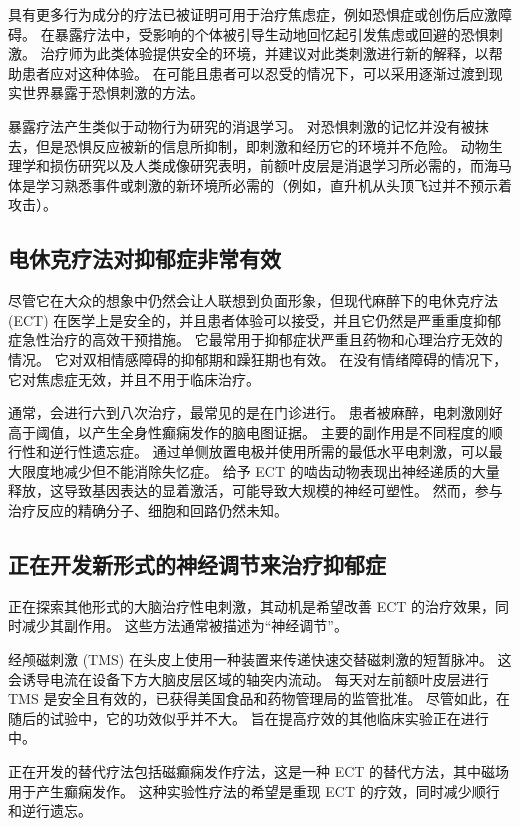 具有更多行为成分的疗法已被证明可用于治疗焦虑症，例如恐惧症或创伤后应激障碍。
在暴露疗法中，受影响的个体被引导生动地回忆起引发焦虑或回避的恐惧刺激。
治疗师为此类体验提供安全的环境，并建议对此类刺激进行新的解释，以帮助患者应对这种体验。
在可能且患者可以忍受的情况下，可以采用逐渐过渡到现实世界暴露于恐惧刺激的方法。


暴露疗法产生类似于动物行为研究的消退学习。
对恐惧刺激的记忆并没有被抹去，但是恐惧反应被新的信息所抑制，即刺激和经历它的环境并不危险。
动物生理学和损伤研究以及人类成像研究表明，前额叶皮层是消退学习所必需的，而海马体是学习熟悉事件或刺激的新环境所必需的（例如，直升机从头顶飞过并不预示着攻击）。



\subsection{电休克疗法对抑郁症非常有效}

尽管它在大众的想象中仍然会让人联想到负面形象，但现代麻醉下的电休克疗法 (ECT) 在医学上是安全的，并且患者体验可以接受，并且它仍然是严重重度抑郁症急性治疗的高效干预措施。
它最常用于抑郁症状严重且药物和心理治疗无效的情况。
它对双相情感障碍的抑郁期和躁狂期也有效。
在没有情绪障碍的情况下，它对焦虑症无效，并且不用于临床治疗。


通常，会进行六到八次治疗，最常见的是在门诊进行。
患者被麻醉，电刺激刚好高于阈值，以产生全身性癫痫发作的脑电图证据。
主要的副作用是不同程度的顺行性和逆行性遗忘症。
通过单侧放置电极并使用所需的最低水平电刺激，可以最大限度地减少但不能消除失忆症。
给予 ECT 的啮齿动物表现出神经递质的大量释放，这导致基因表达的显着激活，可能导致大规模的神经可塑性。
然而，参与治疗反应的精确分子、细胞和回路仍然未知。



\subsection{正在开发新形式的神经调节来治疗抑郁症}

正在探索其他形式的大脑治疗性电刺激，其动机是希望改善 ECT 的治疗效果，同时减少其副作用。
这些方法通常被描述为“神经调节”。


经颅磁刺激 (TMS) 在头皮上使用一种装置来传递快速交替磁刺激的短暂脉冲。 这会诱导电流在设备下方大脑皮层区域的轴突内流动。 每天对左前额叶皮层进行 TMS 是安全且有效的，已获得美国食品和药物管理局的监管批准。 尽管如此，在随后的试验中，它的功效似乎并不大。 旨在提高疗效的其他临床实验正在进行中。

正在开发的替代疗法包括磁癫痫发作疗法，这是一种 ECT 的替代方法，其中磁场用于产生癫痫发作。 这种实验性疗法的希望是重现 ECT 的疗效，同时减少顺行和逆行遗忘。


